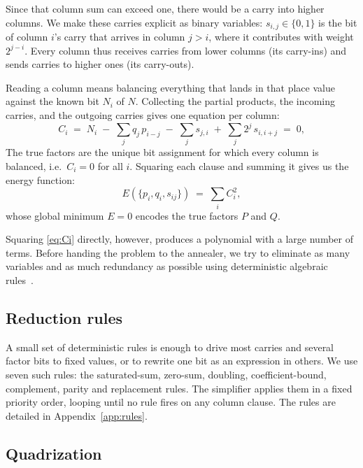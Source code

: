 \documentclass[pdflatex,sn-apa]{sn-jnl}%
\theoremstyle{thmstyleone}%
\theoremstyle{thmstyletwo}%
\theoremstyle{thmstylethree}%
\begin{document}
Since that column sum can exceed one, there would be a carry into higher columns. We make these carries explicit as binary variables: $s_{i,j} \in \{0,1\}$ is the bit of column $i$'s carry that arrives in column $j > i$, where it contributes with weight $2^{j-i}$. Every column thus receives carries from lower columns (its carry-ins) and sends carries to higher ones (its carry-outs).

Reading a column means balancing everything that lands in that place value against the known bit $N_i$ of $N$. Collecting the partial products, the incoming carries, and the outgoing carries gives one equation per column:
\begin{equation}
  C_i \;=\; N_i \;-\; \sum_j q_j\, p_{i-j}
            \;-\; \sum_j s_{j,i}
            \;+\; \sum_j 2^{j}\, s_{i,i+j} \;=\; 0,
  \label{eq:Ci}
\end{equation}
The true factors are the unique bit assignment for which every column is balanced, i.e.\ $C_i = 0$ for all $i$. Squaring each clause and summing it gives us the energy function:
\begin{equation}
  E(\{p_i, q_i, s_{ij}\}) \;=\; \sum_i C_i^2,
  \label{eq:energy}
\end{equation}
whose global minimum $E = 0$ encodes the true factors $P$ and $Q$.

Squaring \eqref{eq:Ci} directly, however, produces a polynomial with a large number of terms. Before handing the problem to the annealer, we try to eliminate as many variables and as much redundancy as possible using deterministic algebraic rules~\citep{Jiang2018}.

\subsection{Reduction rules}\label{sec:rules}

A small set of deterministic rules is enough to drive most carries and several factor bits to fixed values, or to rewrite one bit as an expression in others. We use seven such rules: the saturated-sum, zero-sum, doubling, coefficient-bound, complement, parity and replacement rules. The simplifier applies them in a fixed priority order, looping until no rule fires on any column clause. The rules are detailed in Appendix~\ref{app:rules}.

\subsection{Quadrization}\label{sec:quad}
\end{document}
